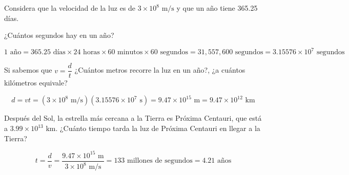 Considera que la velocidad de la luz es de $3 \times 10^{8} \text{ m/s}$ y que un año tiene 365.25 días.

\begin{parts}
    ¿Cuántos segundos hay en un año?

    \begin{solutionbox}{1.6cm}
        \[ 1 \text{ año} = 365.25 \text{ días} \times 24 \text{ horas} \times 60 \text{ minutos} \times 60 \text{ segundos} = 31,557,600 \text{ segundos}=3.15576 \times 10^{7} \text{ segundos}\]
    \end{solutionbox}

    Si sabemos que $v=\dfrac{d}{t}$ ¿Cuántos metros recorre la luz en un año?, ¿a cuántos kilómetros equivale?

    \begin{solutionbox}{1.6cm}
        \[ d=vt=\left(3 \times 10^{8} \text{ m/s}\right)\left(3.15576 \times 10^{7} \text{ s}\right)=9.47 \times 10^{15} \text{ m}=9.47 \times 10^{12} \text{ km}\]
    \end{solutionbox}

    Después del Sol, la estrella más cercana a la Tierra es Próxima Centauri, que está a $3.99 \times 10^{13} \text{ km}$. ¿Cuánto tiempo tarda la luz de Próxima Centauri en llegar a la Tierra?

    \begin{solutionbox}{2cm}
        \[ t=\dfrac{d}{v}=\dfrac{9.47 \times 10^{15} \text{ m}}{3 \times 10^{8} \text{ m/s}}=133 \text{ millones de segundos} = 4.21 \text{ años}\]
    \end{solutionbox}
\end{parts}

